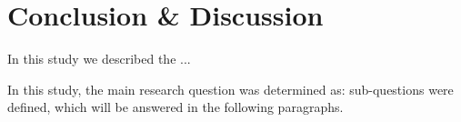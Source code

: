 \chapter{Conclusion \& Discussion}
\label{chap:conclusion}
In this study we described the ...

In this study, the main research question was determined as: \myMainRQ
sub-questions were defined, which will be answered in the following paragraphs.

















